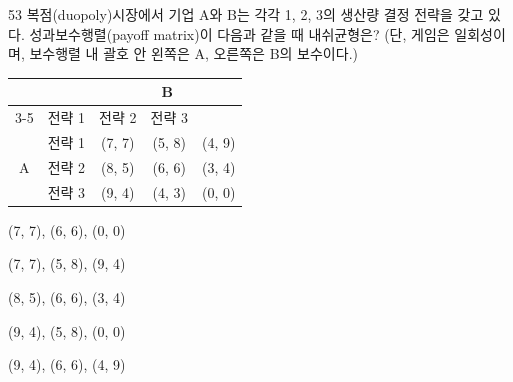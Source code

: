 \begin{question}{53}
복점(duopoly)시장에서 기업 A와 B는 각각 1, 2, 3의 생산량 결정 전략을 갖고 있다. 성과보수행렬(payoff matrix)이 다음과 같을 때 내쉬균형은? (단, 게임은 일회성이며, 보수행렬 내 괄호 안 왼쪽은 A, 오른쪽은 B의 보수이다.)
\begin{center}
\renewcommand{\arraystretch}{1.15}
\begin{tabular}{|c|c|c|c|c|}\hline
\multicolumn{2}{|c|}{} & \multicolumn{3}{c|}{B} \\ \cline{3-5}
\multicolumn{2}{|c|}{} & 전략 1 & 전략 2 & 전략 3 \\ \hline
\multirow{3}{*}{A} & 전략 1 & (7, 7) & (5, 8) & (4, 9) \\ \cline{2-5}
 & 전략 2 & (8, 5) & (6, 6) & (3, 4) \\ \cline{2-5}
 & 전략 3 & (9, 4) & (4, 3) & (0, 0) \\ \hline
\end{tabular}
\end{center}
\begin{choices}
  \item (7, 7), (6, 6), (0, 0)
  \item (7, 7), (5, 8), (9, 4)
  \item (8, 5), (6, 6), (3, 4)
  \item (9, 4), (5, 8), (0, 0)
  \item (9, 4), (6, 6), (4, 9)
\end{choices}
\end{question}
